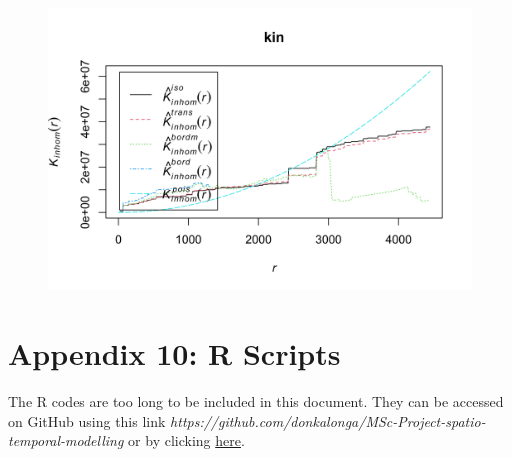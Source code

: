     \begin{figure}[H]
        \begin{center}
            \includegraphics[width=\linewidth]{Inhomogeneous K Function - Major 13456.png}
        \end{center}
    \end{figure}

    \newpage

\section*{Appendix 10: R Scripts}

The R codes are too long to be included in this document. They can be accessed on GitHub using this link \textit{https://github.com/donkalonga/MSc-Project-spatio-temporal-modelling} or by clicking \href{https://github.com/donkalonga/MSc-Project-spatio-temporal-modelling}{here}.

